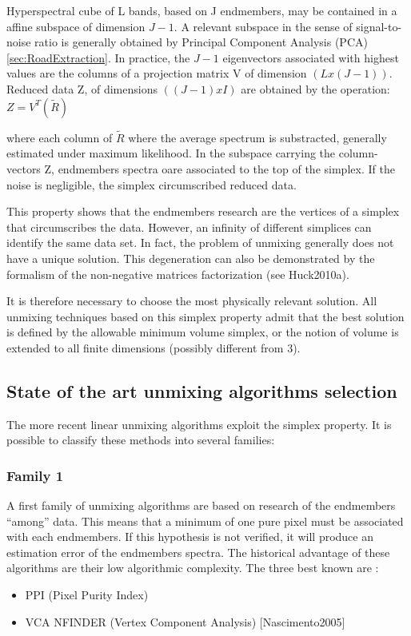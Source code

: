 Hyperspectral cube of L bands, based on J endmembers,
may be contained in a affine subspace of dimension $J-1$.
A relevant subspace in the sense of signal-to-noise ratio is
generally obtained by Principal Component Analysis (PCA) \ref{sec:RoadExtraction}. 
In practice, the $J-1$ eigenvectors associated with highest values are
the columns of a projection matrix V of dimension $(Lx(J-1))$. Reduced
data Z, of dimensions $((J-1)xI)$ are obtained by the operation:
$Z=V^{T}(\tilde{R})$

where each column of $\tilde{R}$ where the average spectrum is substracted,
generally estimated under maximum likelihood. In the
subspace carrying the column-vectors Z, endmembers spectra oare associated to the top of the simplex. If the noise is
negligible, the simplex circumscribed reduced data.

This property shows that the endmembers research are the vertices of a
simplex that circumscribes the data. However, an infinity of different
simplices can identify the same data set. In fact, the problem of
unmixing generally does not have a unique solution. This degeneration can also be
demonstrated by the formalism of the non-negative
matrices factorization (see Huck2010a).

It is therefore necessary to choose the most physically
relevant solution. All unmixing techniques based on this simplex property admit that the best solution is defined by the allowable
minimum volume simplex, or the notion of volume is extended to all
finite dimensions (possibly different from 3).
  

\subsection{State of the art unmixing algorithms selection} 
The more recent linear unmixing algorithms exploit the
simplex property. It is possible to classify these methods into several families:

\subsubsection{Family 1} 
A first family of unmixing algorithms are based on research of the
endmembers ``among'' data. This means that a minimum of one pure pixel must
be associated with each endmembers. If this hypothesis is not
verified, it will produce an estimation error of the endmembers spectra. The historical advantage of these algorithms are their low
algorithmic complexity. The three best known are :
\begin{itemize}
\item PPI (Pixel Purity Index)
\item VCA NFINDER (Vertex Component Analysis) [Nascimento2005]
\end{itemize}

